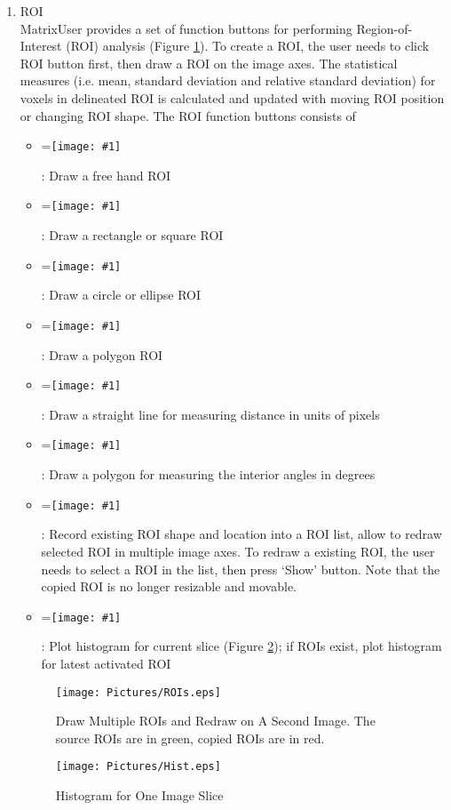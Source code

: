 \documentclass{book}%
\newcommand{\vcenteredinclude}[1]{
\begingroup
\setbox0=\hbox{\texttt{[image: \#1]}}
\parbox{\wd0}{\box0}\endgroup}
\begin{document}
\begin{enumerate}
\begin{itemize}
	\end{itemize}
	
	
	\item ROI \\
	
MatrixUser provides a set of function buttons for performing Region-of-Interest (ROI) analysis (Figure \ref{fig:ROIs}). To create a ROI, the user needs to click ROI button first, then draw a ROI on the image axes. The statistical measures (i.e. mean, standard deviation and relative standard deviation) for voxels in delineated ROI is calculated and updated with moving ROI position or changing ROI shape. The ROI function buttons consists of

	\begin{itemize}
		\item \vcenteredinclude{Pictures/FreeROI.eps} : Draw a free hand ROI
		\item \vcenteredinclude{Pictures/RectangleROI.eps} : Draw a rectangle or square ROI
		\item \vcenteredinclude{Pictures/CircleROI.eps} : Draw a circle or ellipse ROI
		\item \vcenteredinclude{Pictures/PolygonROI.eps} : Draw a polygon ROI
		\item \vcenteredinclude{Pictures/LineROI.eps} : Draw a straight line for measuring distance in units of pixels
		\item \vcenteredinclude{Pictures/AngleROI.eps} : Draw a polygon for measuring the interior angles in degrees
		\item \vcenteredinclude{Pictures/ROIManager.eps} : Record existing ROI shape and location into a ROI list, allow to redraw selected ROI in multiple image axes. To redraw a existing ROI, the user needs to select a ROI in the list, then press `Show' button. Note that the copied ROI is no longer resizable and movable.
		\item \vcenteredinclude{Pictures/Histogram.eps} : Plot histogram for current slice (Figure \ref{fig:Hist}); if ROIs exist, plot histogram for latest activated ROI
	\end{itemize}
	
	\begin{figure}[htbp]
		\centering
			\texttt{[image: Pictures/ROIs.eps]}
		\caption{Draw Multiple ROIs and Redraw on A Second Image. The source ROIs are in green, copied ROIs are in red.}
		\label{fig:ROIs}
	\end{figure}
	
	
	\begin{figure}[htbp]
		\centering
			\texttt{[image: Pictures/Hist.eps]}
		\caption{Histogram for One Image Slice}
		\label{fig:Hist}
	\end{figure}
	

\end{enumerate}
\end{document}
